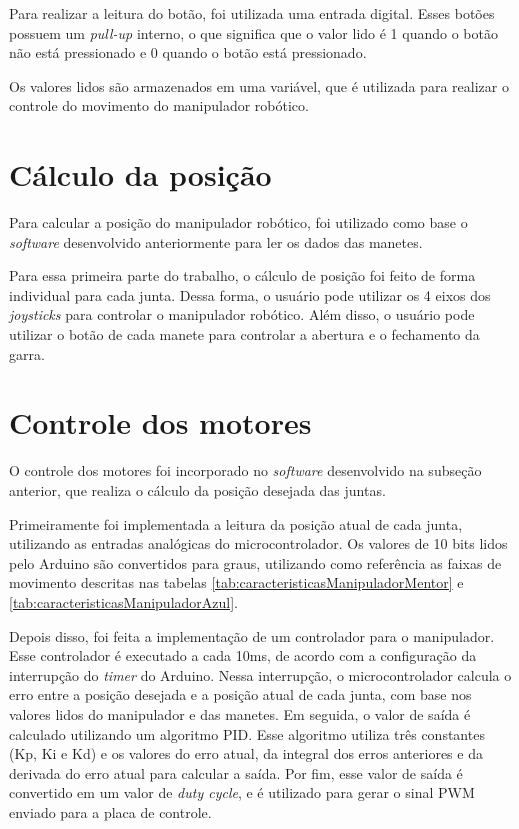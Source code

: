 Para realizar a leitura do botão, foi utilizada uma entrada digital.
Esses botões possuem um \textit{pull-up} interno, o que significa que o valor lido é 1 quando o botão não está pressionado e 0 quando o botão está pressionado.

Os valores lidos são armazenados em uma variável, que é utilizada para realizar o controle do movimento do manipulador robótico.

\section[Cálculo da posição]{Cálculo da posição}
\label{sec:calculoPosicao}

Para calcular a posição do manipulador robótico, foi utilizado como base o \textit{software} desenvolvido anteriormente para ler os dados das manetes.

Para essa primeira parte do trabalho, o cálculo de posição foi feito de forma individual para cada junta.
Dessa forma, o usuário pode utilizar os 4 eixos dos \textit{joysticks} para controlar o manipulador robótico.
Além disso, o usuário pode utilizar o botão de cada manete para controlar a abertura e o fechamento da garra.

\section[Controle dos motores]{Controle dos motores}
\label{sec:controleMotores}

O controle dos motores foi incorporado no \textit{software} desenvolvido na subseção anterior, que realiza o cálculo da posição desejada das juntas.

Primeiramente foi implementada a leitura da posição atual de cada junta, utilizando as entradas analógicas do microcontrolador.
Os valores de 10 bits lidos pelo Arduino são convertidos para graus, utilizando como referência as faixas de movimento descritas nas tabelas \ref{tab:caracteristicasManipuladorMentor} e \ref{tab:caracteristicasManipuladorAzul}.

Depois disso, foi feita a implementação de um controlador para o manipulador.
Esse controlador é executado a cada 10ms, de acordo com a configuração da interrupção do \textit{timer} do Arduino.
Nessa interrupção, o microcontrolador calcula o erro entre a posição desejada e a posição atual de cada junta, com base nos valores lidos do manipulador e das manetes.
Em seguida, o valor de saída é calculado utilizando um algoritmo PID.
Esse algoritmo utiliza três constantes (Kp, Ki e Kd) e os valores do erro atual, da integral dos erros anteriores e da derivada do erro atual para calcular a saída.
Por fim, esse valor de saída é convertido em um valor de \textit{duty cycle}, e é utilizado para gerar o sinal PWM enviado para a placa de controle.